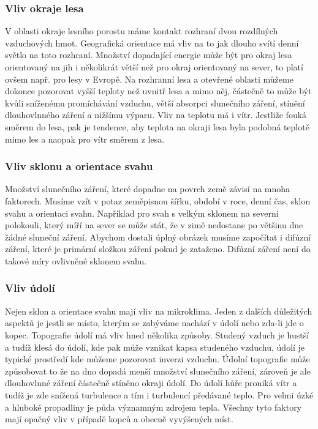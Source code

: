 \subsubsection{Vliv okraje lesa}
V oblasti okraje lesního porostu máme kontakt rozhraní dvou rozdílných vzduchových hmot. Geografická orientace má vliv na to jak dlouho svítí denní světlo na toto rozhraní. Množství dopadající energie může být pro okraj lesa orientovaný na jih i několikrát větší než pro okraj orientovaný na sever, to platí ovšem např. pro lesy v Evropě. Na rozhranní lesa a otevřené oblasti můžeme dokonce pozorovat vyšší teploty než uvnitř lesa a mimo něj, částečně to může být kvůli sníženému promíchávání vzduchu, větší absorpci slunečního záření, stínění dlouhovlnného záření a nižšímu výparu. Vliv na teplotu má i vítr. Jestliže fouká směrem do lesa, pak je tendence, aby teplota na okraji lesa byla podobná teplotě mimo les a naopak pro vítr směrem z lesa\cite{alma}.

\subsubsection{Vliv sklonu a orientace svahu}
Množství slunečního záření, které dopadne na povrch země závisí na mnoha faktorech. Musíme vzít v potaz zeměpisnou šířku, období v roce, denní čas, sklon svahu a orientaci svahu. Například pro svah s velkým sklonem na severní polokouli, který míří na sever se může stát, že v zimě nedostane po většinu dne žádné sluneční záření. Abychom dostali úplný obrázek musíme započítat i difúzní záření, které je primární složkou záření pokud je zataženo. Difúzní záření není do takové míry ovlivněné sklonem svahu\cite{alma}.

\subsubsection{Vliv údolí}
Nejen sklon a orientace svahu mají vliv na mikroklima. Jeden z dalších důležitých aspektů je jestli se místo, kterým se zabýváme nachází v údolí nebo zda-li jde o kopec. Topografie údolí má vliv hned několika způsoby. Studený vzduch je hustší a tudíž klesá do údolí, kde pak může vznikat kapsa studeného vzduchu, údolí je typické prostředí kde můžeme pozorovat inverzi vzduchu. Údolní topografie může způsobovat to že na dno dopadá menší množství slunečního záření, zároveň je ale dlouhovlnné záření částečně stíněno okraji údolí. Do údolí hůře proniká vítr a tudíž je zde snížená turbulence a tím i turbulencí předávané teplo. Pro velmi úzké a hluboké propadliny je půda významným zdrojem tepla. Všechny tyto faktory mají opačný vliv v případě kopců a obecně vyvýšených míst\cite{alma}. 

